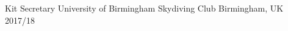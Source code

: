 

\begin{cvhonors}

  \cvhonor
    {Kit Secretary} %
    {University of Birmingham Skydiving Club} %
    {Birmingham, UK} %
    {2017/18} %

\end{cvhonors}
